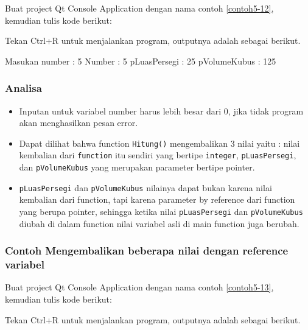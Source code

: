 Buat project Qt Console Application dengan nama contoh \ref{contoh5-12}, kemudian
tulis kode berikut:



Tekan Ctrl+R untuk menjalankan program, outputnya adalah sebagai
berikut.

\begin{lcverbatim}
Masukan number : 5
Number : 5
pLuasPersegi : 25
pVolumeKubus : 125
\end{lcverbatim}

\subsubsection*{Analisa}

\begin{itemize}

\item
  Inputan untuk variabel number harus lebih besar dari 0, jika tidak
  program akan menghasilkan pesan error.
\item
  Dapat dilihat bahwa function \texttt{Hitung()} mengembalikan 3 nilai
  yaitu : nilai kembalian dari \texttt{function} itu sendiri yang
  bertipe \texttt{integer}, \texttt{pLuasPersegi}, dan
  \texttt{pVolumeKubus} yang merupakan parameter bertipe pointer.
\item
  \texttt{pLuasPersegi} dan \texttt{pVolumeKubus} nilainya dapat bukan
  karena nilai kembalian dari function, tapi karena parameter by
  reference dari function yang berupa pointer, sehingga ketika nilai
  \texttt{pLuasPersegi} dan \texttt{pVolumeKubus} diubah di dalam
  function nilai variabel asli di main function juga berubah.
\end{itemize}

\subsubsection*{Contoh  Mengembalikan beberapa nilai dengan reference variabel}

Buat project Qt Console Application dengan nama contoh \ref{contoh5-13}, kemudian
tulis kode berikut:



Tekan Ctrl+R untuk menjalankan program, outputnya adalah sebagai
berikut.

